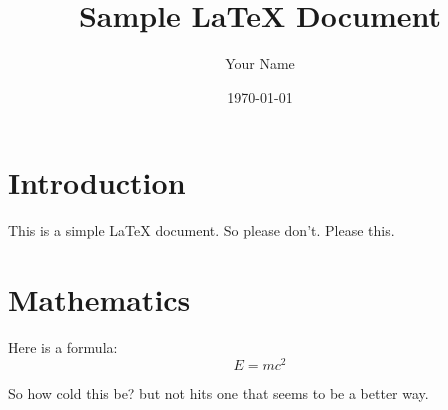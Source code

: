 \documentclass{article}
\begin{document}
\title{Sample LaTeX Document}
\author{Your Name}
\date{\today}
\maketitle

\section{Introduction}
This is a simple LaTeX document. So please don't. Please this.

\section{Mathematics}
Here is a formula:
\[
E = mc^2
\]

So how cold this be? but not hits one that seems to be a better way.
\end{document}
